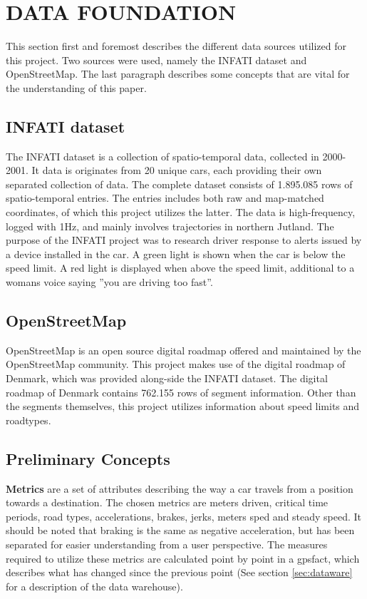 \section{DATA FOUNDATION}\label{sec:datafound}

This section first and foremost describes the different data sources utilized for this project. Two sources were used, namely the INFATI dataset and OpenStreetMap. The last paragraph describes some concepts that are vital for the understanding of this paper. 

\subsection{INFATI dataset}
The INFATI dataset\cite{art:INFATI} is a collection of spatio-temporal data, collected in 2000-2001. It data is originates from 20 unique cars, each providing their own separated collection of data. The complete dataset consists of 1.895.085 rows of spatio-temporal entries. The entries includes both raw and map-matched coordinates, of which this project utilizes the latter. The data is high-frequency, logged with 1Hz, and mainly involves trajectories in northern Jutland. The purpose of the INFATI\cite{art:INFATI} project was to research driver response to alerts issued by a device installed in the car. A green light is shown when the car is below the speed limit. A red light is displayed when above the speed limit, additional to a womans voice saying ''you are driving too fast''.

\subsection{OpenStreetMap}
OpenStreetMap\cite{osm} is an open source digital roadmap offered and maintained by the OpenStreetMap community. This project makes use of the digital roadmap of Denmark, which was provided along-side the INFATI dataset\cite{art:INFATI}. The digital roadmap of Denmark contains 762.155 rows of segment information. Other than the segments themselves, this project utilizes information about speed limits and roadtypes.

\subsection{Preliminary Concepts}\label{subsec:precon}
\textbf{Metrics} are a set of attributes describing the way a car travels from a position towards a destination. The chosen metrics are meters driven, critical time periods, road types, accelerations, brakes, jerks, meters sped and steady speed. It should be noted that braking is the same as negative acceleration, but has been separated for easier understanding from a user perspective. The measures required to utilize these metrics are calculated point by point in a gpsfact, which describes what has changed since the previous point (See section \ref{sec:dataware} for a description of the data warehouse).

